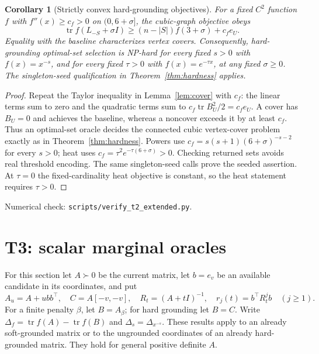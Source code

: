 \documentclass[11pt]{article}
\newtheorem{corollary}[theorem]{Corollary}
\DeclareMathOperator{\tr}{tr}
\begin{document}
\begin{corollary}[Strictly convex hard-grounding objectives]\label{cor:hardextended}
For a fixed $C^2$ function $f$ with $f''(x)\geq c_f>0$ on
$(0,6+\sigma]$, the cubic-graph objective obeys
\[
 \tr f(L_{-S}+\sigma I)\geq(n-|S|)f(3+\sigma)+c_f e_U.
\]
Equality with the baseline characterizes vertex covers. Consequently,
hard-grounding optimal-set selection is NP-hard for every fixed $s>0$
with $f(x)=x^{-s}$, and for every fixed $\tau>0$ with
$f(x)=e^{-\tau x}$, at any fixed $\sigma\geq0$.
The singleton-seed qualification in Theorem~\ref{thm:hardness} applies.
\end{corollary}
\begin{proof}
Repeat the Taylor inequality in Lemma~\ref{lem:cover} with $c_f$:
the linear terms sum to zero and the quadratic terms sum to
$c_f\tr B_U^2/2=c_f e_U$. A cover has $B_U=0$ and achieves the
baseline, whereas a noncover exceeds it by at least $c_f$.
Thus an optimal-set oracle decides the connected cubic vertex-cover
problem exactly as in Theorem~\ref{thm:hardness}. Powers use
$c_f=s(s+1)(6+\sigma)^{-s-2}$ for every $s>0$; heat uses
$c_f=\tau^2e^{-\tau(6+\sigma)}>0$. Checking returned sets avoids
real threshold encoding. The same singleton-seed calls prove the
seeded assertion. At $\tau=0$ the fixed-cardinality heat objective
is constant, so the heat statement requires $\tau>0$.
\end{proof}
\noindent Numerical check: \texttt{scripts/verify\_t2\_extended.py}.

\section{T3: scalar marginal oracles}
For this section let $A\succ0$ be the current matrix, let $b=e_v$ be
an available candidate in its coordinates, and put
\[
 A_u=A+ubb^\top,\quad C=A[-v,-v],\quad
 R_t=(A+tI)^{-1},\quad r_j(t)=b^\top R_t^j b\quad(j\geq1).
\]
For a finite penalty $\beta$, let $B=A_\beta$; for hard grounding let
$B=C$. Write $\Delta_f=\tr f(A)-\tr f(B)$ and
$\Delta_s=\Delta_{x^{-s}}$. These results apply to an already
soft-grounded matrix or to the ungrounded coordinates of an already
hard-grounded matrix. They hold for general positive definite $A$.
\end{document}

